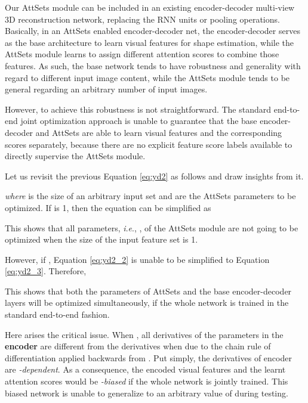 \documentclass[twocolumn]{svjour3}    \pdfoutput=1
\newcommand{\nickname}{AttSets}
\newcommand{\ie}{\textit{i}.\textit{e}., }
\newcommand{\rev}{}
\begin{document}
Our \nickname{} module can be included in an existing encoder-decoder multi-view 3D reconstruction network, replacing the RNN units or pooling operations. Basically, in an \nickname{} enabled encoder-decoder net, the encoder-decoder serves as the base architecture to learn visual features for shape estimation, while the \nickname{} module learns to assign different attention scores to combine those features. As such, the base network tends to have robustness and generality with regard to different input image content, while the \nickname{} module tends to be general regarding an arbitrary number of input images. 

However, to achieve this robustness is not straightforward. The standard end-to-end joint optimization approach is unable to guarantee that the base encoder-decoder and \nickname{} are able to learn visual features and the corresponding scores separately, because there are no explicit feature score labels available to directly supervise the \nickname{} module. 

Let us revisit the previous Equation \ref{eq:yd2} as follows and draw insights from it.
\begin{ceqn}

\end{ceqn}
\textit{where}  is the size of an arbitrary input set and  are the \nickname{} parameters to be optimized. If  is 1, then the equation can be simplified as
\begin{ceqn}

\end{ceqn}
This shows that all parameters, \ie , of the \nickname{} module are not going to be optimized when the size of the input feature set is 1. 

However, if , Equation \ref{eq:yd2_2} is unable to be simplified to Equation \ref{eq:yd2_3}. Therefore, 
\begin{ceqn}

\end{ceqn}
This shows that both the parameters of \nickname{} and the base encoder-decoder layers will be optimized simultaneously, if the whole network is trained in the standard end-to-end fashion.

Here arises the critical issue. When , all derivatives of the parameters in the \textbf{encoder} are different from the derivatives when  due to the chain rule of differentiation applied backwards from . \rev{Put simply, the derivatives of encoder are \textit{-dependent}. As a consequence, the encoded visual features and the learnt attention scores would be \textit{-biased} if the whole network is jointly trained. This biased network is unable to generalize to an arbitrary value of  during testing.}
\end{document}

